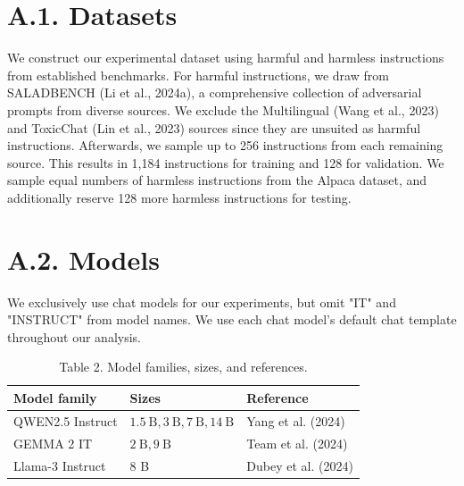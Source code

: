 \documentclass[10pt]{article}
\begin{document}
\section*{A.1. Datasets}
We construct our experimental dataset using harmful and harmless instructions from established benchmarks. For harmful instructions, we draw from SALADBENCH (Li et al., 2024a), a comprehensive collection of adversarial prompts from diverse sources. We exclude the Multilingual (Wang et al., 2023) and ToxicChat (Lin et al., 2023) sources since they are unsuited as harmful instructions. Afterwards, we sample up to 256 instructions from each remaining source. This results in 1,184 instructions for training and 128 for validation. We sample equal numbers of harmless instructions from the Alpaca dataset, and additionally reserve 128 more harmless instructions for testing.

\section*{A.2. Models}
We exclusively use chat models for our experiments, but omit "IT" and "INSTRUCT" from model names. We use each chat model's default chat template throughout our analysis.

\begin{table}[h]
\begin{center}
\captionsetup{labelformat=empty}
\caption{Table 2. Model families, sizes, and references.}
\begin{tabular}{lll}
\hline
Model family & Sizes & Reference \\
\hline
QWEN2.5 Instruct & $1.5 \mathrm{~B}, 3 \mathrm{~B}, 7 \mathrm{~B}, 14 \mathrm{~B}$ & Yang et al. (2024) \\
GEMMA 2 IT & $2 \mathrm{~B}, 9 \mathrm{~B}$ & Team et al. (2024) \\
Llama-3 Instruct & 8 B & Dubey et al. (2024) \\
\hline
\end{tabular}
\end{center}
\end{table}
\end{document}

